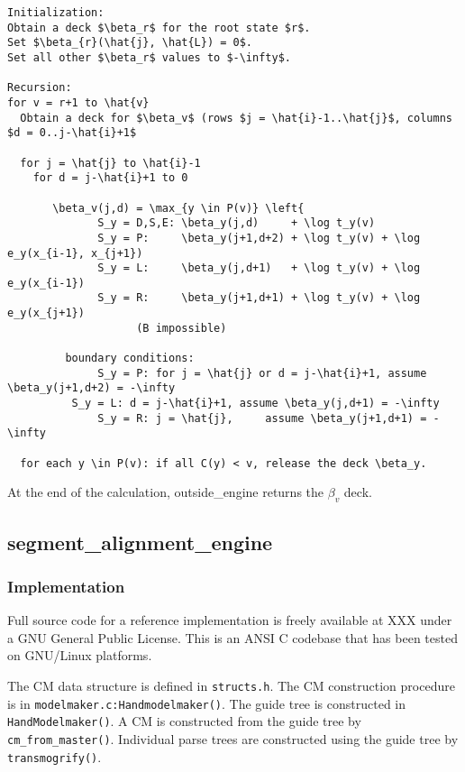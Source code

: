 \documentclass[11pt]{article}
\begin{document}
\begin{verbatim}
Initialization:
Obtain a deck $\beta_r$ for the root state $r$.
Set $\beta_{r}(\hat{j}, \hat{L}) = 0$.
Set all other $\beta_r$ values to $-\infty$.

Recursion:
for v = r+1 to \hat{v}
  Obtain a deck for $\beta_v$ (rows $j = \hat{i}-1..\hat{j}$, columns $d = 0..j-\hat{i}+1$
  
  for j = \hat{j} to \hat{i}-1
    for d = j-\hat{i}+1 to 0
       
       \beta_v(j,d) = \max_{y \in P(v)} \left{ 
              S_y = D,S,E: \beta_y(j,d)     + \log t_y(v) 
              S_y = P:     \beta_y(j+1,d+2) + \log t_y(v) + \log e_y(x_{i-1}, x_{j+1})
              S_y = L:     \beta_y(j,d+1)   + \log t_y(v) + \log e_y(x_{i-1})
              S_y = R:     \beta_y(j+1,d+1) + \log t_y(v) + \log e_y(x_{j+1})
                    (B impossible)

         boundary conditions:
              S_y = P: for j = \hat{j} or d = j-\hat{i}+1, assume \beta_y(j+1,d+2) = -\infty
	      S_y = L: d = j-\hat{i}+1, assume \beta_y(j,d+1) = -\infty
              S_y = R: j = \hat{j},     assume \beta_y(j+1,d+1) = -\infty

  for each y \in P(v): if all C(y) < v, release the deck \beta_y.
\end{verbatim}

At the end of the calculation, outside\_engine returns the $\beta_v$
deck.


\subsection{segment\_alignment\_engine}


\subsubsection{Implementation}

Full source code for a reference implementation is freely available at
XXX under a GNU General Public License. This is an ANSI C codebase
that has been tested on GNU/Linux platforms.

The CM data structure is defined in \texttt{structs.h}. The CM
construction procedure is in
\texttt{modelmaker.c:Handmodelmaker()}. The guide tree is constructed
in \texttt{HandModelmaker()}. A CM is constructed from the guide tree
by \texttt{cm\_from\_master()}. Individual parse trees are constructed
using the guide tree by \texttt{transmogrify()}.
\end{document}
